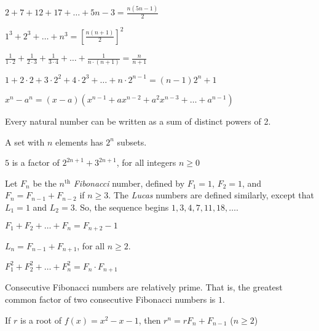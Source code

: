 \documentclass[12pt]{amsart}
\theoremstyle{definition}
\begin{document}
\problem $2+7+12+17+\dots +5n-3=\frac{n(5n-1)}{2}$\vspace{.05in}

\problem $1^3+2^3+\dots +n^3=[\frac{n(n+1)}{2}]^2$\vspace{.05in}

\problem $\frac{1}{1\cdot 2}+\frac{1}{2\cdot 3}+\frac{1}{3\cdot 4}+\dots +\frac{1}{n\cdot (n+1)}=\frac{n}{n+1}$\vspace{.05in}

\problem $1+2\cdot 2+ 3\cdot 2^2+4\cdot 2^3+\dots +n\cdot 2^{n-1}=(n-1)2^n+1$\vspace{.05in}%

\problem $x^n-a^n=(x-a)(x^{n-1}+ax^{n-2}+a^2x^{n-3}+\dots +a^{n-1})$\vspace{.05in}%

\problem Every natural number can be written as a sum of distinct powers of 2.\vspace{.05in}

\problem A set with $n$ elements has $2^n$ subsets.\vspace{.05in}

\problem $5$ is a factor of $2^{2n+1}+3^{2n+1}$, for all integers $n\geq 0$\vspace{.05in}

 \begin{small}Let $F_n$ be the $n^{\text{th}}$ \emph{Fibonacci} number, defined by $F_1=1$, $F_2=1$, and $F_n=F_{n-1}+F_{n-2}$ if $n\geq 3$.  The \emph{Lucas} numbers are defined similarly, except that $L_1=1$ and $L_2=3$.  So, the sequence begins $1,3,4,7,11,18,\dots$.\end{small}

\problem $F_1+F_2+\dots +F_n=F_{n+2}-1$\vspace{.05in}

\problem $L_n=F_{n-1}+F_{n+1}$, for all $n\geq 2$.\vspace{.05in}

\problem $F_1^2+F_2^2+\dots +F_n^2=F_n\cdot F_{n+1}$\vspace{.05in}

\problem Consecutive Fibonacci numbers are relatively prime. That is, the greatest common factor of two consecutive Fibonacci numbers is $1$. \vspace{.05in}

\problem If $r$ is a root of $f(x)=x^2-x-1$, then $r^n=rF_n+F_{n-1}$  ($n\geq 2$)\vspace{.05in}
\end{document}
